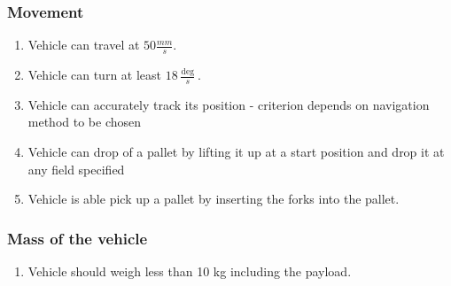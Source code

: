 \documentclass[../report.tex]{subfiles}
\begin{document}
        \subsubsection{Movement}
           \begin{center}
                \begin{enumerate}
                    \item Vehicle can travel at $50\frac{mm}{s}$.
                    \item Vehicle can turn at least $18 \frac{\deg }{s}$. %
                    \item Vehicle can accurately track its position - criterion depends on navigation method to be chosen
                    \item Vehicle can drop of a pallet by lifting it up at a start position and drop it at any field specified
                    \item Vehicle is able pick up a pallet by inserting the forks into the pallet. %
                \end{enumerate}
            \end{center}

        \subsubsection{Mass of the vehicle}
        \begin{center}
            \begin{enumerate}
                \item Vehicle should weigh less than 10 kg including the payload. %
            \end{enumerate}
        \end{center}
\end{document}
